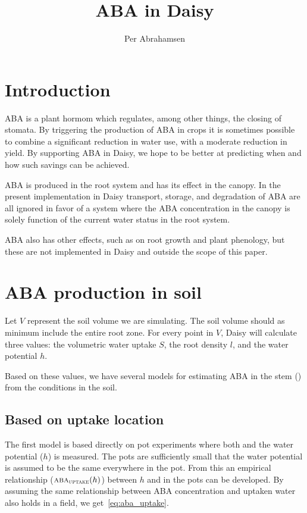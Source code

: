 \documentclass[a4paper,11pt,twoside]{article}
\newcommand{\aba}[1]{\text{\textsc{aba}$_\text{\textsc{#1}}$}}
\begin{document}
\title{ABA in Daisy}
\author{Per Abrahamsen}
\maketitle

\section{Introduction}

ABA is a plant hormom which regulates, among other things, the closing
of stomata.  By triggering the production of ABA in crops it is
sometimes possible to combine a significant reduction in water use,
with a moderate reduction in yield.  By supporting ABA in Daisy, we
hope to be better at predicting when and how such savings can be
achieved.

ABA is produced in the root system and has its effect in the canopy.
In the present implementation in Daisy transport, storage, and
degradation of ABA are all ignored in favor of a system where the ABA
concentration in the canopy is solely function of the current water
status in the root system.

ABA also has other effects, such as on root growth and plant
phenology, but these are not implemented in Daisy and outside the
scope of this paper.

\section{ABA production in soil}

Let $V$ represent the soil volume we are simulating.  The soil volume
should as minimum include the entire root zone.  For every point in
$V$, Daisy will calculate three values: the volumetric water uptake
$S$, the root density $l$, and the water potential $h$.

Based on these values, we have several models for estimating ABA in
the stem (\aba{xylem}) from the conditions in the soil.

\subsection{Based on uptake location}

The first model is based directly on pot experiments where both
\aba{xylem} and the water potential ($h$) is measured.  The pots are
sufficiently small that the water potential is assumed to be the same
everywhere in the pot.  From this an empirical relationship
($\aba{uptake}(h)$) between $h$ and \aba{xylem} in the pots can be
developed.  By assuming the same relationship between ABA
concentration and uptaken water also holds in a field, we
get~\eqref{eq:aba_uptake}.
\end{document}
